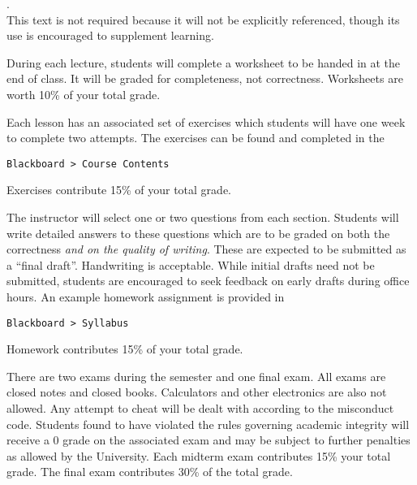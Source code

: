 \documentclass{assets/syllabus}
\begin{document}
\Coursetext. \\

\noindent This text is not required because it will not be explicitly
referenced, though its use is encouraged to supplement learning.


During each lecture, students will complete a worksheet to
be handed in at the end of class.  It will be graded for
completeness, not correctness.  Worksheets are worth 10\% of
your total grade.


Each lesson has an associated set of exercises which
students will have one week to complete two attempts. The
exercises can be found and completed in the

\begin{center}
  \texttt{Blackboard > Course Contents}
\end{center}

\noindent Exercises contribute 15\% of your total grade.


\pagebreak
{}

The instructor will select one or two questions from each
section. Students will write detailed answers to
these questions which are to be graded on both the
correctness \emph{and on the quality of writing}.  These are
expected to be submitted as a ``final draft''. Handwriting
is acceptable.  While initial drafts need not be submitted,
students are encouraged to seek feedback on early drafts
during office hours.  An example homework assignment is
provided in

\begin{center}
  \texttt{Blackboard > Syllabus}
\end{center}

\noindent Homework contributes 15\% of your total grade.


There are two exams during the semester and one final
exam. All exams are closed notes and closed
books. Calculators and other electronics are also not
allowed. Any attempt to cheat will be dealt with according
to the misconduct code.  Students found to have violated the
rules governing academic integrity will receive a 0 grade on
the associated exam and may be subject to further penalties
as allowed by the University.  Each midterm exam contributes
15\% your total grade.  The final exam contributes 30\% of
the total grade.
\end{document}
